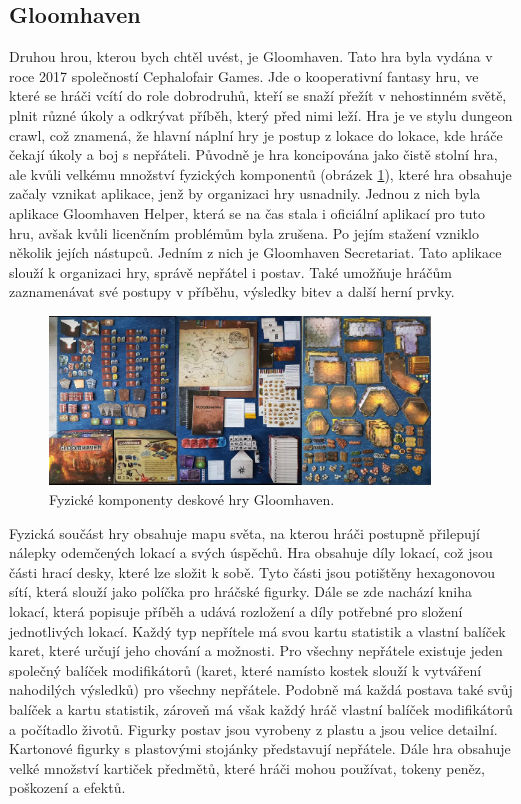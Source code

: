 \subsection{Gloomhaven}
Druhou hrou, kterou bych chtěl uvést, je Gloomhaven. Tato hra byla vydána v roce 2017 společností Cephalofair Games. Jde o kooperativní fantasy hru, ve které se hráči vcítí do role dobrodruhů, kteří se snaží přežít v nehostinném světě, plnit různé úkoly a odkrývat příběh, který před nimi leží. Hra je ve stylu dungeon crawl, což znamená, že hlavní náplní hry je postup z lokace do lokace, kde hráče čekají úkoly a boj s nepřáteli. Původně je hra koncipována jako čistě stolní hra, ale kvůli velkému množství fyzických komponentů (obrázek \ref{fig:gloomhaven_contents}), které hra obsahuje začaly vznikat aplikace, jenž by organizaci hry usnadnily. Jednou z nich byla aplikace Gloomhaven Helper\cite{gloomhaven_helper}, která se na čas stala i oficiální aplikací pro tuto hru, avšak kvůli licenčním problémům byla zrušena. Po jejím stažení vzniklo několik jejích nástupců. Jedním z nich je Gloomhaven Secretariat\cite{gloomhaven_secretariat}. Tato aplikace slouží k organizaci hry, správě nepřátel i postav. Také umožňuje hráčům zaznamenávat své postupy v příběhu, výsledky bitev a další herní prvky.

\begin{figure}[H]
    \centering
    \includegraphics[width=0.9\textwidth]{resources/figures/gloomhaven.png}
    \caption{Fyzické komponenty deskové hry Gloomhaven.\cite{gloomhaven}}
    \label{fig:gloomhaven_contents}
\end{figure}

Fyzická součást hry obsahuje mapu světa, na kterou hráči postupně přilepují nálepky odemčených lokací a svých úspěchů. Hra obsahuje díly lokací, což jsou části hrací desky, které lze složit k sobě. Tyto části jsou potištěny hexagonovou sítí, která slouží jako políčka pro hráčské figurky. Dále se zde nachází kniha lokací, která popisuje příběh a udává rozložení a díly potřebné pro složení jednotlivých lokací. Každý typ nepřítele má svou kartu statistik a vlastní balíček karet, které určují jeho chování a možnosti. Pro všechny nepřátele existuje jeden společný balíček modifikátorů (karet, které namísto kostek slouží k vytváření nahodilých výsledků) pro všechny nepřátele. Podobně má každá postava také svůj balíček a kartu statistik, zároveň má však každý hráč vlastní balíček modifikátorů a počítadlo životů. Figurky postav jsou vyrobeny z plastu a jsou velice detailní. Kartonové figurky s plastovými stojánky představují nepřátele. Dále hra obsahuje velké množství kartiček předmětů, které hráči mohou používat, tokeny peněz, poškození a efektů.